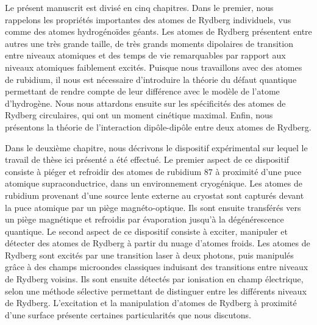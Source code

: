 \bigskip
Le présent manuscrit est divisé en cinq chapitres.
Dans le premier, nous rappelons les propriétés importantes des atomes de Rydberg individuels, vus comme des atomes hydrogénoïdes géants.
Les atomes de Rydberg présentent entre autres une très grande taille, de très grands moments dipolaires de transition entre niveaux atomiques et des temps de vie remarquables par rapport aux niveaux atomiques faiblement excités.
Puisque nous travaillons avec des atomes de rubidium, il nous est nécessaire d'introduire la théorie du défaut quantique permettant de rendre compte de leur différence avec le modèle de l'atome d'hydrogène.
Nous nous attardons ensuite sur les spécificités des atomes de Rydberg circulaires, qui ont un moment cinétique maximal.
Enfin, nous présentons la théorie de l'interaction dipôle-dipôle entre deux atomes de Rydberg.

Dans le deuxième chapitre, nous décrivons le dispositif expérimental sur lequel le travail de thèse ici présenté a été effectué.
Le premier aspect de ce dispositif consiste à piéger et refroidir des atomes de rubidium $87$ à proximité d'une puce atomique supraconductrice, dans un environnement cryogénique.
Les atomes de rubidium provenant d'une source lente externe au cryostat sont capturés devant la puce atomique par un piège magnéto-optique.
Ils sont ensuite transférés vers un piège magnétique et refroidis par évaporation jusqu'à la dégénérescence quantique.
Le second aspect de ce dispositif consiste à exciter, manipuler et détecter des atomes de Rydberg à partir du nuage d'atomes froids.
Les atomes de Rydberg sont excités par une transition laser à deux photons, puis manipulés grâce à des champs microondes classiques induisant des transitions entre niveaux de Rydberg voisins.
Ils sont ensuite détectés par ionisation en champ électrique, selon une méthode sélective permettant de distinguer entre les différents niveaux de Rydberg.
L'excitation et la manipulation d'atomes de Rydberg à proximité d'une surface présente certaines particularités que nous discutons.

